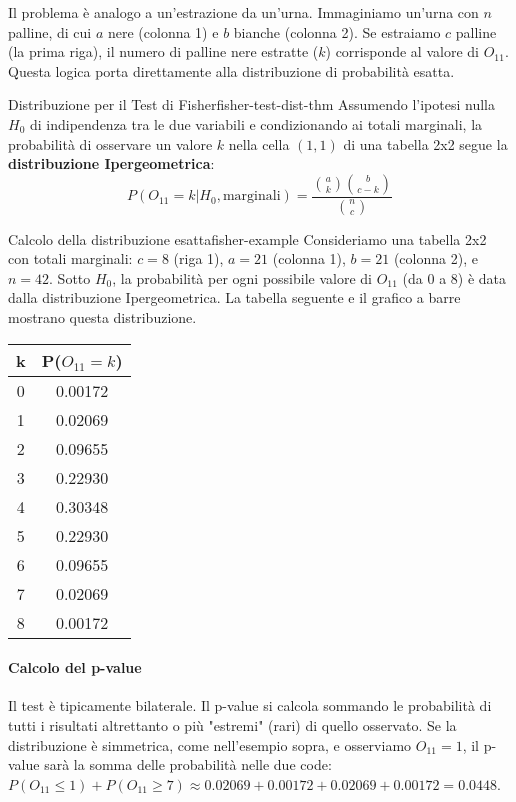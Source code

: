 Il problema è analogo a un'estrazione da un'urna. Immaginiamo un'urna con \(n\)
palline, di cui \(a\) nere (colonna 1) e \(b\) bianche (colonna 2). Se estraiamo
\(c\) palline (la prima riga), il numero di palline nere estratte (\(k\))
corrisponde al valore di \(O_{11}\). Questa logica porta direttamente alla
distribuzione di probabilità esatta.

\begin{teorema}{Distribuzione per il Test di Fisher}{fisher-test-dist-thm}
Assumendo l'ipotesi nulla \(H_0\) di indipendenza tra le due variabili e
condizionando ai totali marginali, la probabilità di osservare un valore \(k\)
nella cella \((1,1)\) di una tabella 2x2 segue la \textbf{distribuzione
Ipergeometrica}:
\[ P(O_{11}=k | H_0, \text{marginali}) = \frac{\binom{a}{k}
\binom{b}{c-k}}{\binom{n}{c}} \]
\end{teorema}

\begin{esempio}{Calcolo della distribuzione esatta}{fisher-example}
    Consideriamo una tabella 2x2 con totali marginali: \(c=8\) (riga 1),
    \(a=21\) (colonna 1), \(b=21\) (colonna 2), e \(n=42\). Sotto \(H_0\), la
    probabilità per ogni possibile valore di \(O_{11}\) (da 0 a 8) è data
    dalla distribuzione Ipergeometrica. La tabella seguente e il grafico a barre
    mostrano questa distribuzione.

    \centering
    \begin{tabular}{c c}
        \toprule
        \textbf{k} & \textbf{P(\(O_{11}=k\))} \\
        \midrule
        0 & 0.00172 \\
        1 & 0.02069 \\
        2 & 0.09655 \\
        3 & 0.22930 \\
        4 & 0.30348 \\
        5 & 0.22930 \\
        6 & 0.09655 \\
        7 & 0.02069 \\
        8 & 0.00172 \\
        \bottomrule
    \end{tabular}
\end{esempio}

\paragraph{Calcolo del p-value}
Il test è tipicamente bilaterale. Il p-value si calcola sommando le
probabilità di tutti i risultati altrettanto o più "estremi" (rari) di quello
osservato. Se la distribuzione è simmetrica, come nell'esempio sopra, e
osserviamo \(O_{11}=1\), il p-value sarà la somma delle probabilità nelle due
code: \( P(O_{11} \le 1) + P(O_{11} \ge 7) \approx 0.02069 + 0.00172 + 0.02069 +
0.00172 = 0.0448 \).
